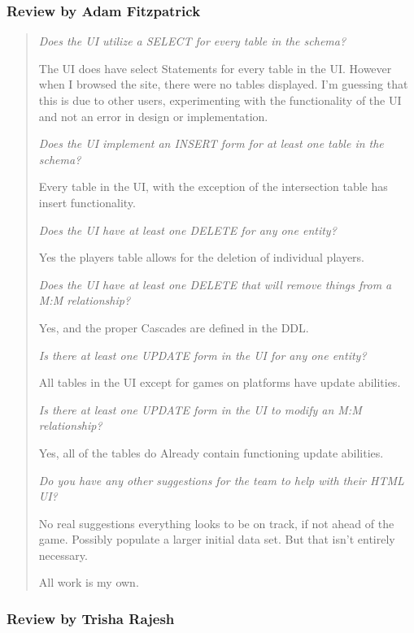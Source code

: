 \documentclass[11pt]{article}
\begin{document}
\subsubsection*{Review by Adam Fitzpatrick}

\begin{quote}
\textit{Does the UI utilize a SELECT for every table in the schema?}

The UI does have select Statements for every table in the UI. However when I browsed the site, there were no tables displayed. I'm guessing that this is due to other users, experimenting with the functionality of the UI and not an error in design or implementation.

\textit{Does the UI implement an INSERT form for at least one table in the schema?}

Every table in the UI, with the exception of the intersection table has insert functionality.

\textit{Does the UI have at least one DELETE for any one entity?}

Yes the players table allows for the deletion of individual players.

\textit{Does the UI have at least one DELETE that will remove things from a M:M relationship?}

Yes, and the proper Cascades are defined in the DDL.

\textit{Is there at least one UPDATE form in the UI for any one entity?}

All tables in the UI except for games on platforms have update abilities.

\textit{Is there at least one UPDATE form in the UI to modify an M:M relationship?}

Yes, all of the tables do Already contain functioning update abilities.

\textit{Do you have any other suggestions for the team to help with their HTML UI?}

No real suggestions everything looks to be on track, if not ahead of the game. Possibly populate a larger initial data set. But that isn't entirely necessary.

All work is my own.
\end{quote}

\subsubsection*{Review by Trisha Rajesh}
\end{document}
